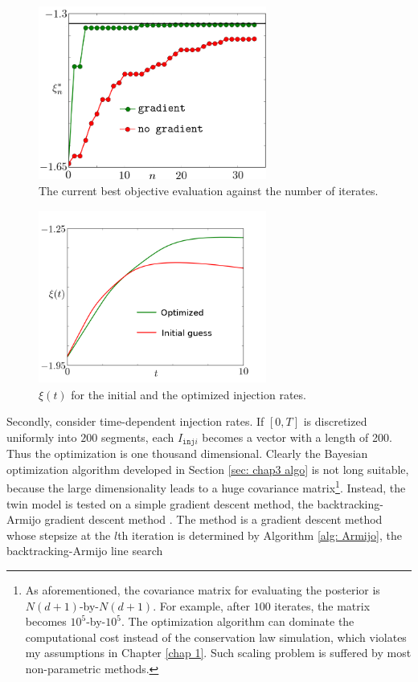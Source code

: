 \begin{figure}[htbp]\begin{center}
    \includegraphics[width=7.5cm,height=5.7cm]{../reservoir_5d_obj.png}
    \caption{The current best objective evaluation against the number of iterates.}
    \label{fig: chap 3 reservoir objective}
\end{center}\end{figure}

\begin{figure}[htbp]\begin{center}
    \includegraphics[width=7.5cm,height=5.7cm]{../reservoir_profit_t.png}
    \caption{$\xi(t)$ for the initial and the optimized injection rates.}
    \label{fig: chap 3 reservoir profit t}
\end{center}\end{figure}

Secondly, consider time-dependent injection rates. If $[0,T]$ is discretized uniformly 
into $200$ segments, each $I_{\texttt{inj}i}$ becomes a vector with a length of 200.
Thus the optimization is one thousand dimensional. Clearly the Bayesian optimization 
algorithm developed in Section \ref{sec: chap3 algo} is not long suitable, because the
large dimensionality leads to a huge covariance matrix\footnote{As aforementioned, 
the covariance matrix for evaluating the posterior is $N(d+1)$-by-$N(d+1)$. 
For example, after $100$ iterates, the matrix becomes $10^5$-by-$10^5$. 
The optimization algorithm can dominate the computational cost instead of the
conservation law simulation, which violates my assumptions in Chapter \ref{chap 1}.
Such scaling problem is suffered by most non-parametric methods.}. Instead,
the twin model is tested on a simple gradient descent method, the 
backtracking-Armijo gradient descent method \cite{backtrack line search}.
The method is a gradient descent method whose stepsize at the $l$th iteration
is determined by Algorithm \ref{alg: Armijo},
the backtracking-Armijo line search \cite{backtrack line search}

